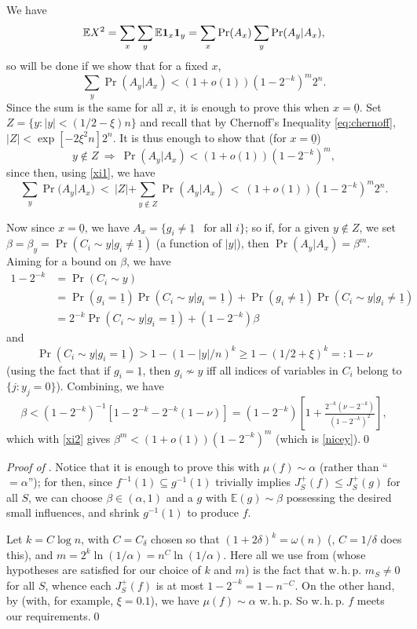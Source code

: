\documentclass{toc}
\newcommand{\one}[0]{{\bf 1}}
\newcommand{\uzero}[0]{\underline{0}}
\newcommand{\uone}[0]{\underline{1}}
\newcommand{\beq}[1]{\begin{equation}\label{#1}}
\newcommand{\enq}[0]{\end{equation}}
\newcommand{\mn}[0]{\medskip\noindent}
\newcommand{\sub}[0]{\subseteq}
\newcommand{\Ra}[0]{\Rightarrow}
\newcommand{\0}[0]{\emptyset}
\newcommand{\ga}[0]{\alpha }
\newcommand{\gb}[0]{\beta }
\newcommand{\gd}[0]{\delta }
\newcommand{\go}[0]{\omega}
\begin{document}
We have
$$
\mathbb E  X^2 = \sum_x\sum_y\mathbb E  \one_x\one_y =\sum_x\Pr(A_x)\sum_y\Pr(A_y|A_x),
$$
so will be done if we show that for a fixed $x$,
$$ 
\sum_y\Pr(A_y|A_x) <(1+o(1)) (1-2^{-k})^m2^n.
$$ 
Since the sum is the same for all $x$, it is enough %
to prove this when $x=\uzero$.
Set $Z=\{y:|y|<(1/2-\xi)n\}$ and recall 
%
that by Chernoff's Inequality \eqref{eq:chernoff}, 
%
%
%
%
$|Z|<\exp[-2\xi^2n]2^n$.
It is thus enough to show that (for $x=\uzero$)
\beq{nicey}
y\not\in Z ~\Ra~\Pr(A_y|A_x)<(1+o(1)) (1-2^{-k})^m,
\enq
since then, using \eqref{xi1}, we have
$$
\sum_y\Pr(A_y|A_x) ~<~ |Z| + \sum_{y\not\in Z}\Pr(A_y|A_x)
~<~ (1+o(1)) (1-2^{-k})^m2^n.
$$


Now since $x=\uzero$, we have
%
$A_x =\{g_i\neq \uone ~~ \text{ for all } i\}$; %
%
%
so 
if, for a given $y\not\in Z$, we set
$\gb =\gb_y=\Pr(C_i\sim y|g_i\neq \uone)$
(a function of $|y|$),
then $\Pr(A_y|A_x) = \gb^m$.
Aiming for a bound on $\gb$, we have
%
\begin{align*}
1-2^{-k}&=\Pr(C_i\sim y) \\
&=
\Pr(g_i=\uone)\Pr(C_i\sim y|g_i=\uone)
+ \Pr(g_i\neq\uone)\Pr(C_i\sim y|g_i\neq \uone)\\
&= 2^{-k}\Pr(C_i\sim y|g_i=\uone) +(1-2^{-k})\gb
\end{align*}
and
$$\Pr(C_i\sim y|g_i=\uone) > 1 - (1-|y|/n)^k
\geq 1-(1/2+\xi)^k=:1-\nu
$$
(using the fact that if
$g_i=\uone$, then $g_i\not\sim y$
iff all indices of
variables in $C_i$ belong to $\{j:y_j=0\}$).
Combining, we have
$$
\gb < (1-2^{-k})^{-1}[1-2^{-k} - 2^{-k}(1-\nu)]
=(1-2^{-k})\left[1+\tfrac{2^{-k}(\nu -2^{-k})}{(1-2^{-k})^2}\right],
$$
which with \eqref{xi2} gives
$\gb^m < (1+o(1))(1-2^{-k})^m$ (which is \eqref{nicey}).\qed

\mn
\emph{Proof of }.    %
Notice that it is %
enough to prove this with $\mu(f) \sim \ga$
(rather than ``$=\ga$'');
for then,
since $f^{-1}(1)\sub g^{-1}(1)$ trivially implies
$J_S^+(f)\leq J_S^+(g)$ for all $S$, we can
choose
$\gb\in (\ga,1)$ and a $g$ with $\mathbb E (g)\sim \gb$
possessing the desired small influences, and
shrink $g^{-1}(1)$ to produce $f$.


Let $k=C\log n$, with $C=C_\gd$ chosen so that
$(1+2\gd)^k=\go(n)$ (\eg, $C=1/\gd$ does this),
and
$m = 2^k \ln (1/\ga)=n^C\ln (1/\ga)$.
Here all we use from 
(whose hypotheses are satisfied for our choice of $k$ and $m$)
is the fact that
w.\,h.\,p. $m_S\neq 0$ for all $S$,
whence each $J_S^+(f)$ is at most
$1-2^{-k}=1-n^{-C}$.
On the other hand, by 
(with, for example, $\xi=0.1$), we have
$\mu(f) \sim \ga$ w.\,h.\,p.
So w.\,h.\,p. $f$ meets our requirements.\qed
\end{document}
